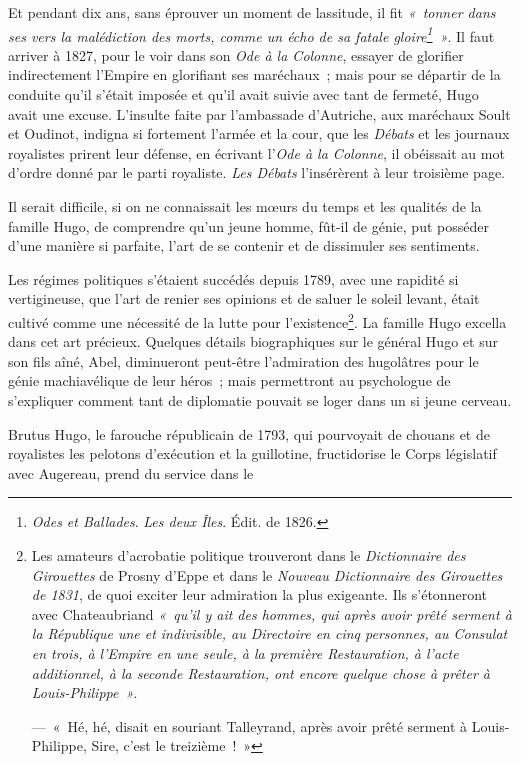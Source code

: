 \documentclass[french,twoside]{book} %
\begin{document}
Et pendant dix ans, sans éprouver un moment de lassitude, il fit \emph{« tonner dans ses vers la malédiction des morts, comme un écho de sa fatale gloire\footnote{\emph{Odes et Ballades}. \emph{Les deux Îles}. Édit. de 1826.} »}. Il faut arriver à 1827, pour le voir dans son \emph{Ode à la Colonne}, essayer de glorifier indirectement l’Empire en glorifiant ses maréchaux ; mais pour se départir de la conduite qu’il s’était imposée et qu’il avait suivie avec tant de fermeté, Hugo avait une excuse. L’insulte faite par l’ambassade d’Autriche, aux maréchaux Soult et Oudinot, indigna si fortement l’armée et la cour, que les \emph{Débats} et les journaux royalistes prirent leur défense, en écrivant  
\label{p18}l’\emph{Ode à la Colonne}, il obéissait au mot d’ordre donné par le parti royaliste. \emph{Les Débats} l’insérèrent à leur troisième page.\par
Il serait difficile, si on ne connaissait les mœurs du temps et les qualités de la famille Hugo, de comprendre qu’un jeune homme, fût-il de génie, put posséder d’une manière si parfaite, l’art de se contenir et de dissimuler ses sentiments.\par
Les régimes politiques s’étaient succédés depuis 1789, avec une rapidité si vertigineuse, que l’art de renier ses opinions et de saluer le soleil levant, était cultivé comme une nécessité de la lutte pour l’existence\footnote{\noindent Les amateurs d’acrobatie politique trouveront dans le \emph{Dictionnaire des Girouettes} de Prosny d’Eppe et dans le \emph{Nouveau Dictionnaire des Girouettes de 1831}, de quoi exciter leur admiration la plus exigeante. Ils s’étonneront avec Chateaubriand \emph{« qu’il y ait des hommes, qui après avoir prêté serment à la République une et indivisible, au Directoire en cinq personnes, au Consulat en trois, à l’Empire en une seule, à la première Restauration, à l’acte additionnel, à la seconde Restauration, ont encore quelque chose à prêter à Louis-Philippe »}.\par
— « Hé, hé, disait en souriant Talleyrand, après avoir prêté serment à Louis-Philippe, Sire, c’est le treizième ! »
}. La famille Hugo excella dans cet art précieux. Quelques détails biographiques sur le général Hugo et sur son fils aîné, Abel, diminueront peut-être l’admiration des hugolâtres pour le génie machiavélique de leur héros ; mais permettront au psychologue de s’expliquer comment tant de diplomatie pouvait se loger dans un si jeune cerveau.\par
Brutus Hugo, le farouche républicain de 1793, qui pourvoyait de chouans et de royalistes les pelotons d’exécution et la guillotine, fructidorise le Corps législatif avec Augereau, prend du service dans le  
\end{document}
